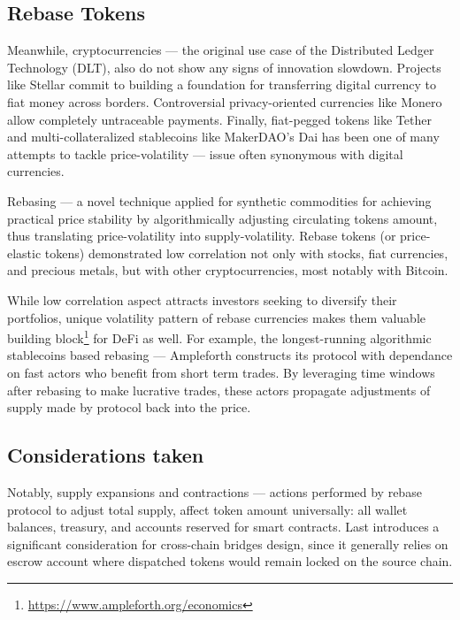 \documentclass{article}
\begin{document}
\subsection{Rebase Tokens}

Meanwhile, cryptocurrencies --- the original use case of the Distributed Ledger Technology (DLT), also do not show any signs of innovation slowdown. Projects like Stellar \cite{mazieres2016stellar} commit to building a foundation for transferring digital currency to fiat money across borders. Controversial privacy-oriented currencies like Monero \cite{saberhagen2013monero} allow completely untraceable payments. Finally, fiat-pegged tokens like Tether \cite{tether2016} and multi-collateralized stablecoins like MakerDAO's Dai \cite{makerdao2020dai} has been one of many attempts to tackle price-volatility --- issue often synonymous with digital currencies.

Rebasing --- a novel technique applied for synthetic commodities for achieving practical price stability by algorithmically adjusting circulating tokens amount, thus translating price-volatility into supply-volatility. Rebase tokens (or price-elastic tokens) demonstrated low correlation not only with stocks, fiat currencies, and precious metals, but with other cryptocurrencies, most notably with Bitcoin.

While low correlation aspect attracts investors seeking to diversify their portfolios, unique volatility pattern of rebase currencies makes them valuable building block\footnote{\url{https://www.ampleforth.org/economics}} for DeFi as well. For example, the longest-running algorithmic stablecoins based rebasing --- Ampleforth \cite{kuo2019ampleforth} constructs its protocol with dependance on fast actors who benefit from short term trades. By leveraging time windows after rebasing to make lucrative trades, these actors propagate adjustments of supply made by protocol back into the price.

\subsection{Considerations taken}

Notably, supply expansions and contractions --- actions performed by rebase protocol to adjust total supply, affect token amount universally: all wallet balances, treasury, and accounts reserved for smart contracts. Last introduces a significant consideration for cross-chain bridges design, since it generally relies on escrow account where dispatched tokens would remain locked on the source chain.
\end{document}

